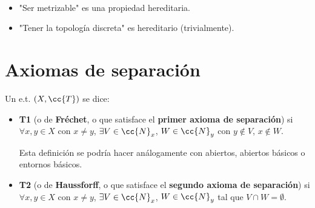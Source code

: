 \begin{ejemplo}\
    \begin{itemize}
        \item "Ser metrizable" es una propiedad hereditaria.
        \item "Tener la topología discreta" es hereditario (trivialmente).
    \end{itemize}
    \endsquare
\end{ejemplo}

\section{Axiomas de separación}

\begin{definicion}
    Un e.t. $(X, \cc{T})$ se dice:
    \begin{itemize}
        \item \textbf{T1} (o de \textbf{Fréchet}, o que satisface el \textbf{primer axioma de separación}) si $\forall x,y \in X$ con $x\neq y$, $\exists V \in \cc{N}_x$, $W\in \cc{N}_y$ con $y\notin V$, $x\notin W$.
        
        \begin{center}
        \end{center}

        Esta definición se podría hacer análogamente con abiertos, abiertos básicos o entornos básicos.

        \item \textbf{T2} (o de \textbf{Haussforff}, o que satisface el \textbf{segundo axioma de separación}) si $\forall x,y \in X$ con $x\neq y$, $\exists V \in \cc{N}_x$, $W\in \cc{N}_y$ tal que $V\cap W = \emptyset$.
        

\end{itemize}
\end{definicion}
